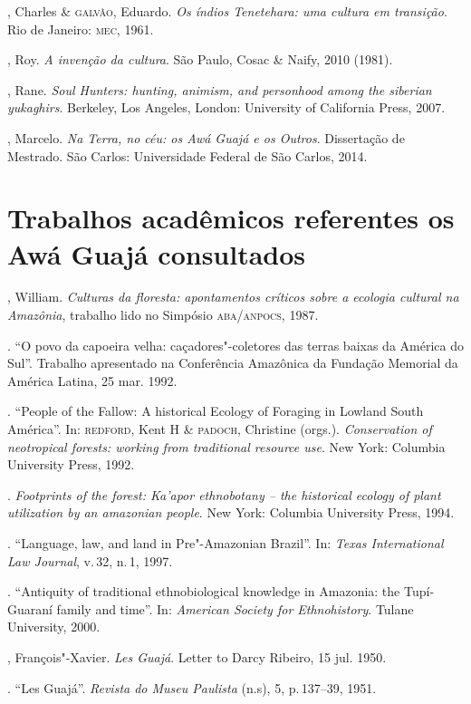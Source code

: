 \begin{bibliohedra}
, Charles \& \textsc{galvão}, Eduardo. \emph{Os índios Tenetehara: uma cultura em transição}. Rio de Janeiro: \textsc{mec}, 1961.

, Roy. \emph{A invenção da cultura}. São Paulo, Cosac \& Naify, 2010 (1981).

, Rane. \emph{Soul Hunters: hunting, animism, and personhood
among the siberian yukaghirs}. Berkeley, Los Angeles, London: University
of California Press, 2007.

, Marcelo. \emph{Na Terra, no céu: os Awá Guajá e os Outros}.
Dissertação de Mestrado. São Carlos: Universidade Federal de São Carlos, 2014.

\section{Trabalhos acadêmicos referentes os Awá Guajá consultados}

, William. \emph{Culturas da floresta: apontamentos críticos
sobre a ecologia cultural na Amazônia}, trabalho lido no Simpósio
\textsc{aba}/\textsc{anpocs}, 1987.

\titidem. ``O povo da capoeira velha: caçadores"-coletores
das terras baixas da América do Sul''. Trabalho apresentado na
Conferência Amazônica da Fundação Memorial da América Latina, 25 mar. 1992.

\titidem. ``People of the Fallow: A historical Ecology of
Foraging in Lowland South América''. In: \textsc{redford}, Kent H \& \textsc{padoch}, Christine (orgs.). \emph{Conservation of neotropical forests: working from
traditional resource use}. New York: Columbia University Press, 1992.

\titidem. \emph{Footprints of the forest: Ka'apor
ethnobotany -- the historical ecology of plant utilization by an
amazonian people}. New York: Columbia University Press, 1994.

\titidem. ``Language, law, and land in Pre"-Amazonian
Brazil''. In: \emph{Texas International Law Journal}, v.\,32, n.\,1, 1997.

\titidem. ``Antiquity of traditional ethnobiological
knowledge in Amazonia: the Tupí-Guaraní family and time''. In:
\emph{American Society for Ethnohistory}. Tulane University, 2000.

, François"-Xavier. \emph{Les Guajá}. Letter to Darcy
Ribeiro, 15 jul. 1950.

\titidem. ``Les Guajá''. \emph{Revista do Museu Paulista} (n.s), 5, p.\,137--39, 1951.


\end{bibliohedra}
